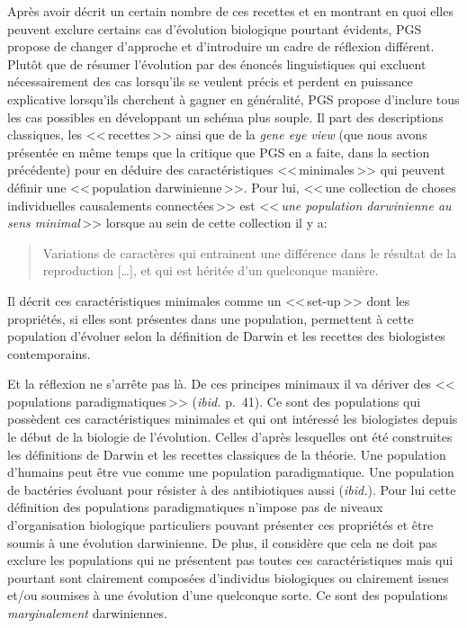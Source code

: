 	Après avoir décrit un certain nombre de ces recettes et en montrant en quoi elles peuvent exclure certains cas d'évolution biologique pourtant évidents, PGS propose de changer d'approche et d'introduire un cadre de réflexion différent. Plutôt que de résumer l'évolution par des énoncés linguistiques qui excluent nécessairement des cas lorsqu'ils se veulent précis et perdent en puissance explicative lorsqu'ils cherchent à gagner en généralité, PGS propose d'inclure tous les cas possibles en développant un schéma plus souple. Il part des descriptions classiques, les <<\,recettes\,>> ainsi que de la \emph{gene eye view} (que nous avons présentée en même temps que la critique que PGS en a faite, dans la section précédente) pour en déduire des caractéristiques <<\,minimales\,>> qui peuvent définir une <<\,population darwinienne\,>>. Pour lui, <<\,une collection de choses individuelles causalements connectées\,>> est <<\,\emph{une population darwinienne au sens minimal}\,>> lorsque au sein de cette collection il y a:
	\begin{quote}
		Variations de caractères qui entrainent une différence dans le résultat de la reproduction [\ldots], et qui est héritée d'un quelconque manière.
	\end{quote}

	Il décrit ces caractéristiques minimales comme un <<\,set-up\,>> dont les propriétés, si elles sont présentes dans une population, permettent à cette population d'évoluer selon la définition de Darwin et les recettes des biologistes contemporains.
	
	Et la réflexion ne s'arrête pas là. De ces principes minimaux il va dériver des <<\,populations paradigmatiques\,>> (\emph{ibid.} p.~41). Ce sont des populations qui possèdent ces caractéristiques minimales et qui ont intéressé les biologistes depuis le début de la biologie de l'évolution. Celles d'après lesquelles ont été construites les définitions de Darwin et les recettes classiques de la théorie. Une population d'humains peut être vue comme une population paradigmatique. Une population de bactéries évoluant pour résister à des antibiotiques aussi (\emph{ibid.}). Pour lui cette définition des populations paradigmatiques n'impose pas de niveaux d'organisation biologique particuliers pouvant présenter ces propriétés et être soumis à une évolution darwinienne. De plus, il considère que cela ne doit pas exclure les populations qui ne présentent pas toutes ces caractéristiques mais qui pourtant sont clairement composées d'individus biologiques ou clairement issues et/ou soumises à une évolution d'une quelconque sorte. Ce sont des populations \emph{marginalement} darwiniennes.

